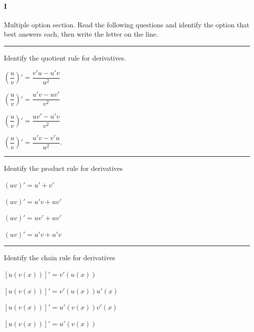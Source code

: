 
\paragraph{I} Multiple option section. 
Read the following questions and identify the option that best answers each, then write the letter on the line.

\begin{preguntas}

\pregunta[4] \rule{1cm}{0.1mm} Identify the quotient rule for derivatives. 

\begin{enumerate*}[label=(\alph*)]
    \item \(\left(\dfrac{u}{v}\right)' = \dfrac{v'u - u'v}{u^2}\)\hspace{2em}
    \item \(\left(\dfrac{u}{v}\right)' = \dfrac{u'v - uv'}{v^2}\) \hspace{2em}
    \item \(\left(\dfrac{u}{v}\right)' = \dfrac{uv' - u'v}{v^2}\) \hspace{2em} 
    \item \(\left(\dfrac{u}{v}\right)' = \dfrac{u'v - v'u}{u^2}\). 
\end{enumerate*}

\pregunta[4] \rule{1cm}{0.1mm} Identify the product rule for derivatives 

\begin{enumerate*}[label=(\alph*)]
    \item \( (uv)' = u' + v' \)\hspace{2em}
    \item \( (uv)' = u'v + uv' \) \hspace{2em}
    \item \( (uv)' = uv' + uv' \)\hspace{2em}
    \item \( (uv)' = u'v + u'v \)
\end{enumerate*}

\pregunta[4] \rule{1cm}{0.1mm} Identify the chain rule for derivatives 

\begin{enumerate*}[label=(\alph*)]
    \item \( \left[u(v(x))\right]' = v'(u(x)) \) 
    \item \( \left[u(v(x))\right]' = v'(u(x))u'(x) \)
    \item \( \left[u(v(x))\right]' = u'(v(x))v'(x) \)
    \item \( \left[u(v(x))\right]' = u'(v(x)) \)
\end{enumerate*}


\end{preguntas}
